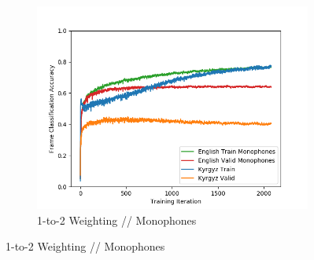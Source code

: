 \documentclass[a4paper]{article}
\begin{document}
\begin{figure}[!htbp]
\begin{subfigure}{.3\textwidth}
  \includegraphics[width=1\textwidth,keepaspectratio]{figs-1/2-to-1-mono.png}
  \caption{1-to-2 Weighting // Monophones}
  \label{fig:sub2}
\end{subfigure}

\medskip


\end{figure}
\end{document}
